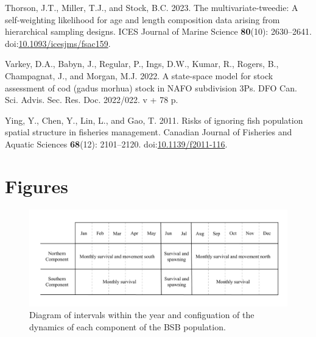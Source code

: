 \documentclass[
]{article}
\newlength{\cslhangindent}
\newlength{\cslentryspacingunit} %
\newenvironment{CSLReferences}[2] %
 {%
  \setlength{\parindent}{0pt}
  \ifodd #1
  \let\oldpar\par
  \def\par{\hangindent=\cslhangindent\oldpar}
  \fi
  \setlength{\parskip}{#2\cslentryspacingunit}
 }%
 {}
\begin{document}
\begin{CSLReferences}{1}{0}
\leavevmode{}%
Thorson, J.T., Miller, T.J., and Stock, B.C. 2023. The
multivariate-tweedie: A self-weighting likelihood for age and length
composition data arising from hierarchical sampling designs. ICES
Journal of Marine Science \textbf{80}(10): 2630--2641.
doi:\href{https://doi.org/10.1093/icesjms/fsac159}{10.1093/icesjms/fsac159}.

\leavevmode{}%
Varkey, D.A., Babyn, J., Regular, P., Ings, D.W., Kumar, R., Rogers, B.,
Champagnat, J., and Morgan, M.J. 2022. A state-space model for stock
assessment of cod (gadus morhua) stock in NAFO subdivision 3Ps. {DFO}
{Can.} {Sci.} {Advis.} {Sec.} {Res.} {Doc.} 2022/022. v + 78 p.

\leavevmode{}%
Ying, Y., Chen, Y., Lin, L., and Gao, T. 2011. Risks of ignoring fish
population spatial structure in fisheries management. Canadian Journal
of Fisheries and Aquatic Sciences \textbf{68}(12): 2101--2120.
doi:\href{https://doi.org/10.1139/f2011-116}{10.1139/f2011-116}.

\end{CSLReferences}

\pagebreak

\pagebreak

\hypertarget{figures}{%
\section*{Figures}\label{figures}}

\begin{figure}

{\centering \includegraphics[width=0.8\linewidth]{bsb_movement_diagram} 

}

\caption{Diagram of intervals within the year and configuation of the dynamics of each component of the BSB population.}\label{fig:migration-diagram}
\end{figure}
\pagebreak
\end{document}
